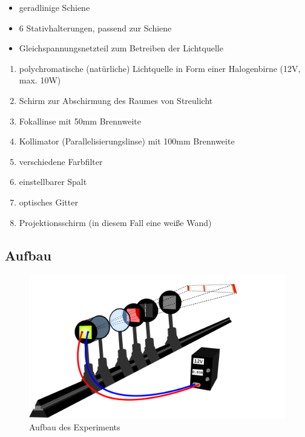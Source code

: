 \documentclass[12pt, a4paper]{article}
\begin{document}
\begin{itemize}
    \item geradlinige Schiene
    \item 6 Stativhalterungen, passend zur Schiene
    \item Gleichspannungsnetzteil zum Betreiben der Lichtquelle
\end{itemize}
\begin{enumerate}
    \item polychromatische (nat\"urliche) Lichtquelle in Form einer Halogenbirne (12V, max. 10W)
    \item Schirm zur Abschirmung des Raumes von Streulicht
    \item Fokallinse mit 50mm Brennweite
    \item Kollimator (Parallelisierungslinse) mit 100mm Brennweite
    \item verschiedene Farbfilter
    \item einstellbarer Spalt
    \item optisches Gitter
    \item Projektionsschirm (in diesem Fall eine weiße Wand)
\end{enumerate}
\newpage

\subsection{Aufbau}
\begin{figure}[h]
    \includegraphics[width=\textwidth]{Aufbau.png}
    \caption[Aufbau]{Aufbau des Experiments}
\end{figure}
\end{document}
